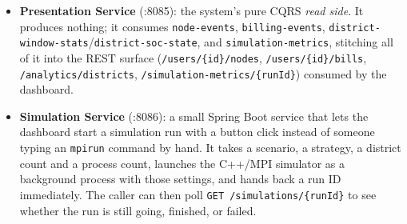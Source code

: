 \begin{itemize}
  This running total always stays within realistic limits, because the C++ simulator (described
  below) already clamps every charge value to the accumulator's physical capacity before it ever
  reaches Kafka.
\item \textbf{Presentation Service} (:8085): the system's pure CQRS \emph{read side}. It produces
  nothing; it consumes \texttt{node-events}, \texttt{billing-events},
  \texttt{district-window-stats}/\texttt{district-soc-state}, and \texttt{simulation-metrics},
  stitching all of it into the REST surface (\texttt{/users/\{id\}/nodes},
  \texttt{/users/\{id\}/bills}, \texttt{/analytics/districts},
  \texttt{/simulation-metrics/\{runId\}}) consumed by the dashboard.
\item \textbf{Simulation Service} (:8086): a small Spring Boot service that lets the dashboard
  start a simulation run with a button click instead of someone typing an \texttt{mpirun} command
  by hand. It takes a scenario, a strategy, a district count and a process count, launches the
  C++/MPI simulator as a background process with those settings, and hands back a run ID
  immediately. The caller can then poll \texttt{GET /simulations/\{runId\}} to see whether the run
  is still going, finished, or failed.
\end{itemize}

